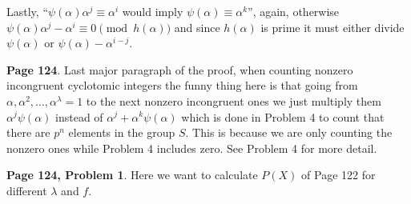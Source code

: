 \documentclass[aps,preprint,preprintnumbers,nofootinbib,showpacs,prd]{revtex4-1}
\begin{document}
Lastly, ``$\psi(\alpha)\alpha^j \equiv \alpha^i$ would imply $\psi(\alpha) \equiv \alpha^k$'', again, otherwise $\psi(\alpha)\alpha^j - \alpha^i \equiv 0 \pmod{h(\alpha)}$ and since $h(\alpha)$ is prime it must either divide $\psi(\alpha)$ or $\psi(\alpha) - \alpha^{i-j}$.


{\bf Page 124}. Last major paragraph of the proof, when counting nonzero incongruent cyclotomic integers the funny thing here is that going from $\alpha,\alpha^2,\dots,\alpha^\lambda = 1$ to the next nonzero incongruent ones we just multiply them $\alpha^j\psi(\alpha)$ instead of $\alpha^j + \alpha^k\psi(\alpha)$ which is done in Problem 4 to count that there are $p^n$ elements in the group $S$. This is because we are only counting the nonzero ones while Problem 4 includes zero. See Problem 4 for more detail.

{\bf Page 124, Problem 1}. Here we want to calculate $P(X)$ of Page 122 for different $\lambda$ and $f$.
\end{document}
